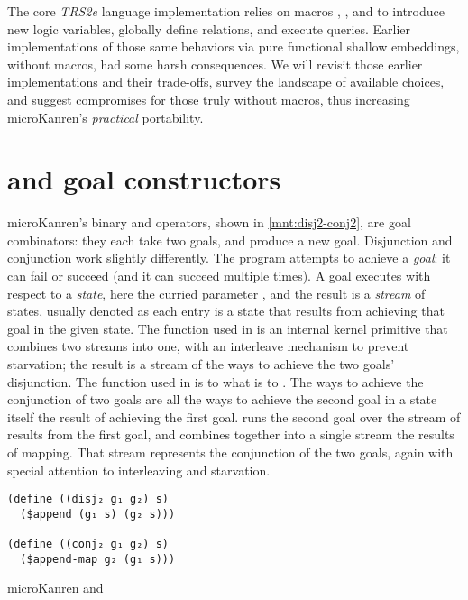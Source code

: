\documentclass[sigplan,balance,pbalance,natbib=false]{acmart}
\begin{document}
The core \emph{TRS2e} language implementation relies on
macros , , and 
to introduce new logic variables, globally define relations, and
execute queries. Earlier implementations of those same behaviors via
pure functional shallow embeddings, without macros, had some harsh
consequences. We will revisit those earlier implementations and their
trade-offs, survey the landscape of available choices, and suggest
compromises for those truly without macros, thus increasing
microKanren's \emph{practical} portability.

\section{ and  goal
  constructors}\label{sec:conde}

microKanren's binary  and 
operators, shown in \cref{mnt:disj2-conj2}, are goal combinators: they
each take two goals, and produce a new goal. Disjunction and
conjunction work slightly differently. The program attempts to achieve
a \emph{goal}: it can fail or succeed (and it can succeed multiple times).
A goal executes with respect to a \emph{state}, here the curried
parameter , and the result is a \emph{stream} of states,
usually denoted  as each entry is a state that results
from achieving that goal in the given state. The
 function used in  is an
internal kernel primitive that combines two streams into one, with an
interleave mechanism to prevent starvation; the result is a stream of
the ways to achieve the two goals' disjunction.
The  function used in  is
to
 what  is
to . The ways to achieve the conjunction of two
goals are all the ways to achieve the second goal in a state itself
the result of achieving the first goal.\@ {}
runs the second goal over the stream of results from the first goal,
and combines together into a single stream the results of mapping.
That stream represents the conjunction of the two goals, again with
special attention to interleaving and starvation.

\begin{listing}
  \begin{verbatim}
(define ((disj₂ g₁ g₂) s)
  ($append (g₁ s) (g₂ s)))

(define ((conj₂ g₁ g₂) s)
  ($append-map g₂ (g₁ s)))
  \end{verbatim}
  \caption{microKanren  and }\label{mnt:disj2-conj2}
\end{listing}
\end{document}
